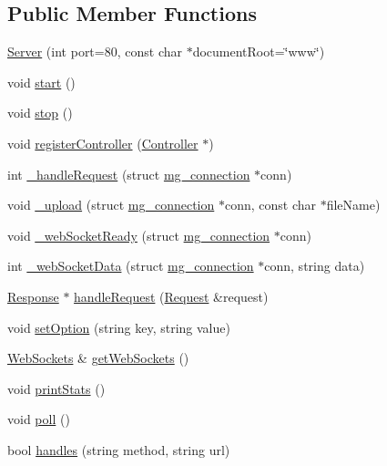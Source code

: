 \subsection*{Public Member Functions}
\begin{DoxyCompactItemize}
\item 
\hyperlink{classMongoose_1_1Server_aca7e4d98d6ee16b15c46791a2d2f2739}{Server} (int port=80, const char $\ast$document\+Root=\char`\"{}www\char`\"{})
\item 
void \hyperlink{classMongoose_1_1Server_a1ea120f0ba0ab8e71e0afb28ad12fbd3}{start} ()
\item 
void \hyperlink{classMongoose_1_1Server_a4da5f1aca21385c007eb7defcf410265}{stop} ()
\item 
void \hyperlink{classMongoose_1_1Server_a9efd2ef8c0d8432ad0f65173dd818bf0}{register\+Controller} (\hyperlink{classMongoose_1_1Controller}{Controller} $\ast$)
\item 
int \hyperlink{classMongoose_1_1Server_a49ee3958235e05c9a8a66dda87f1b304}{\+\_\+handle\+Request} (struct \hyperlink{structmg__connection}{mg\+\_\+connection} $\ast$conn)
\item 
void \hyperlink{classMongoose_1_1Server_ab9ce5c4c5bacc867947f2c975b8dd495}{\+\_\+upload} (struct \hyperlink{structmg__connection}{mg\+\_\+connection} $\ast$conn, const char $\ast$file\+Name)
\item 
void \hyperlink{classMongoose_1_1Server_a43e3c4c39a9e9cc59527071c3febbfec}{\+\_\+web\+Socket\+Ready} (struct \hyperlink{structmg__connection}{mg\+\_\+connection} $\ast$conn)
\item 
int \hyperlink{classMongoose_1_1Server_a9d0decf97aaff999935a246037d0c1b8}{\+\_\+web\+Socket\+Data} (struct \hyperlink{structmg__connection}{mg\+\_\+connection} $\ast$conn, string data)
\item 
\hyperlink{classMongoose_1_1Response}{Response} $\ast$ \hyperlink{classMongoose_1_1Server_aa4421fe1e9d141ee9f3520570eb0d372}{handle\+Request} (\hyperlink{classMongoose_1_1Request}{Request} \&request)
\item 
void \hyperlink{classMongoose_1_1Server_a3364cff3a91cc284ca43aba0bf859efa}{set\+Option} (string key, string value)
\item 
\hyperlink{classMongoose_1_1WebSockets}{Web\+Sockets} \& \hyperlink{classMongoose_1_1Server_a5560e2a8394bb202e3ec415a0d059503}{get\+Web\+Sockets} ()
\item 
void \hyperlink{classMongoose_1_1Server_a9095044ead0a2f09c2fa7d4da8b1f991}{print\+Stats} ()
\item 
void \hyperlink{classMongoose_1_1Server_a91beaea7ac911c4e826a92bbde79fcc6}{poll} ()
\item 
bool \hyperlink{classMongoose_1_1Server_a067a174ddf1fc0ead483807883834c62}{handles} (string method, string url)
\end{DoxyCompactItemize}
